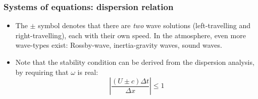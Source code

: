 \documentclass[aspectratio=149,9pt]{beamer}
\begin{document}
%
%
\begin{frame}
	\frametitle{Systems of equations: dispersion relation}
	\begin{itemize}
		\item The $\pm$ symbol denotes that there are \emph{two} wave solutions (left-travelling and right-travelling), each with their own speed. In the atmosphere, even more wave-types exist: Rossby-wave, inertia-gravity waves, sound waves.\vspace*{2ex}
		\item Note that the stability condition can be derived from the dispersion analysis, by requiring that $\omega$ is real:
			\begin{equation*}
				\left |\frac{(U\pm c)\Delta t}{\Delta x} \right| \leq 1
			\end{equation*}
	\end{itemize}
\end{frame}
%
%
\end{document}
